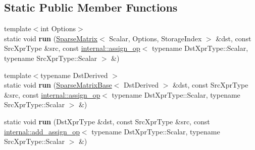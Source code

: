 \subsection*{Static Public Member Functions}
\begin{DoxyCompactItemize}
\item 
\mbox{\label{struct_eigen_1_1internal_1_1_assignment_3_01_dst_xpr_type_00_01_src_xpr_type_00_01_functor_00_01_diagonal2_sparse_01_4_a3ebebc30f1ceca09787e5ad5c0fd9c43}} 
{\footnotesize template$<$int Options$>$ }\\static void {\bfseries run} (\hyperlink{group___sparse_core___module_class_eigen_1_1_sparse_matrix}{Sparse\+Matrix}$<$ Scalar, Options, Storage\+Index $>$ \&dst, const Src\+Xpr\+Type \&src, const \hyperlink{struct_eigen_1_1internal_1_1assign__op}{internal\+::assign\+\_\+op}$<$ typename Dst\+Xpr\+Type\+::\+Scalar, typename Src\+Xpr\+Type\+::\+Scalar $>$ \&)
\item 
\mbox{\label{struct_eigen_1_1internal_1_1_assignment_3_01_dst_xpr_type_00_01_src_xpr_type_00_01_functor_00_01_diagonal2_sparse_01_4_af302c9a90f62006c28bec8184a1c3c08}} 
{\footnotesize template$<$typename Dst\+Derived $>$ }\\static void {\bfseries run} (\hyperlink{group___sparse_core___module_class_eigen_1_1_sparse_matrix_base}{Sparse\+Matrix\+Base}$<$ Dst\+Derived $>$ \&dst, const Src\+Xpr\+Type \&src, const \hyperlink{struct_eigen_1_1internal_1_1assign__op}{internal\+::assign\+\_\+op}$<$ typename Dst\+Xpr\+Type\+::\+Scalar, typename Src\+Xpr\+Type\+::\+Scalar $>$ \&)
\item 
\mbox{\label{struct_eigen_1_1internal_1_1_assignment_3_01_dst_xpr_type_00_01_src_xpr_type_00_01_functor_00_01_diagonal2_sparse_01_4_aa5fb6b65cca9c9cbafd0102a9b8184dc}} 
static void {\bfseries run} (Dst\+Xpr\+Type \&dst, const Src\+Xpr\+Type \&src, const \hyperlink{struct_eigen_1_1internal_1_1add__assign__op}{internal\+::add\+\_\+assign\+\_\+op}$<$ typename Dst\+Xpr\+Type\+::\+Scalar, typename Src\+Xpr\+Type\+::\+Scalar $>$ \&)
\item 

\end{DoxyCompactItemize}
